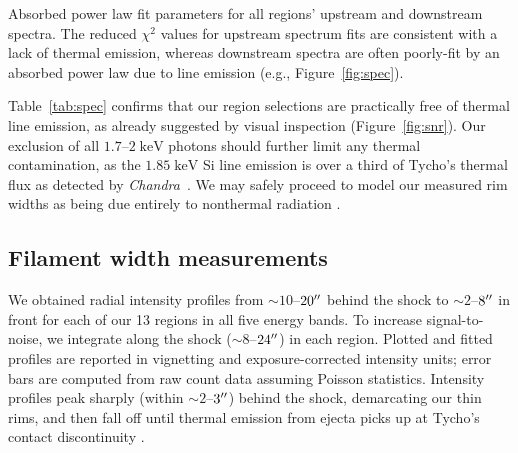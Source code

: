 \documentclass[iop, apj, numberedappendix, twocolappendix]{emulateapj}
\newcommand*{\mt}{\mathrm}
\newcommand*{\unit}[1]{\;\mt{#1}}  %
\newcommand*{\abt}{\mathord{\sim}} %
\newcommand*{\Chandra}{\textit{Chandra}\ }
\begin{document}
\begin{table}
    \scriptsize
    \centering
    \caption{Absorbed power law fit parameters for all regions' upstream and
    downstream spectra.  The reduced $\chi^2$ values for upstream spectrum fits
    are consistent with a lack of thermal emission, whereas downstream spectra
    are often poorly-fit by an absorbed power law due to line
    emission (e.g., Figure~\ref{fig:spec}).\label{tab:spec}}
    
\end{table}

Table~\ref{tab:spec} confirms that our region selections are practically free
of thermal line emission, as already suggested by visual inspection
(Figure~\ref{fig:snr}).  Our exclusion of all $1.7$--$2
\unit{keV}$ photons should further limit any thermal contamination, as
the $1.85 \unit{keV}$ Si line emission is over a third of Tycho's thermal flux
as detected by \Chandra \citep{hwang2002}.  We may safely proceed to model our
measured rim widths as being due entirely to nonthermal radiation
.

\subsection{Filament width measurements}
\label{sec:fwhms}

We obtained radial intensity profiles from $\abt 10$--$20\mbox{$^{\prime\prime}$}$ behind the
shock to $\abt 2$--$8\mbox{$^{\prime\prime}$}$ in front for each of our 13 regions in all five
energy bands.  To increase signal-to-noise, we integrate along the shock ($\abt
8$--$24\mbox{$^{\prime\prime}$}$) in each region.   Plotted and fitted profiles are reported in vignetting and
exposure-corrected  intensity units;
error bars are computed from raw count data assuming Poisson statistics.
Intensity profiles peak sharply (within $\abt 2$--$3\mbox{$^{\prime\prime}$}$) behind the shock,
demarcating our thin rims, and then fall off until thermal emission from ejecta
picks up at Tycho's contact discontinuity \citep{warren2005}.
\end{document}
